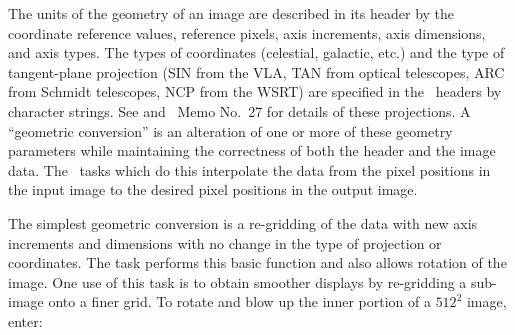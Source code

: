 
     The units of the geometry of an image are described in its header
by the coordinate reference values, reference pixels, axis increments,
axis dimensions, and axis types.  The types of coordinates (celestial,
galactic, etc.) and the type of tangent-plane projection (SIN from the
VLA, TAN from optical telescopes, ARC from Schmidt telescopes, NCP
from the WSRT) are specified in the \AIPS\ headers by character
strings.  See  and \AIPS\ Memo No.~27 for details of
these projections.  A ``geometric conversion'' is an alteration of one
or more of these geometry parameters while maintaining the correctness
of both the header and the image data.  The \AIPS\ tasks which do this
interpolate the data from the pixel positions in the input image to
the desired pixel positions in the output image.

     The simplest geometric conversion is a re-gridding of the data
with new axis increments and dimensions with no change in the type of
projection or coordinates.  The task {\tt {}} performs this
basic function and also allows rotation of the image.  One use of
this task is to obtain smoother displays by re-gridding a sub-image onto
a finer grid.  To rotate and blow up the inner portion of a $512^2$
image, enter:

